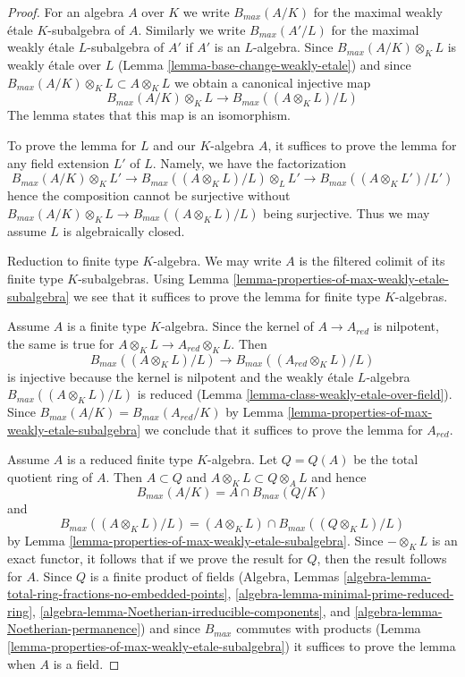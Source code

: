 \documentclass[10pt,a4paper]{amsart}
\theoremstyle{plain}
\theoremstyle{definition}
\theoremstyle{remark}
\numberwithin{equation}{subsection}
\begin{document}
\begin{proof}
For an algebra $A$ over $K$ we write $B_{max}(A/K)$
for the maximal weakly \'etale $K$-subalgebra of $A$.
Similarly we write $B_{max}(A'/L)$ for the maximal weakly \'etale
$L$-subalgebra of $A'$ if $A'$ is an $L$-algebra.
Since $B_{max}(A/K) \otimes_K L$ is weakly \'etale over $L$
(Lemma \ref{lemma-base-change-weakly-etale})
and since $B_{max}(A/K) \otimes_K L \subset A \otimes_K L$
we obtain a canonical injective map
$$
B_{max}(A/K) \otimes_K L \to B_{max}((A \otimes_K L)/L)
$$
The lemma states that this map is an isomorphism.

\medskip\noindent
To prove the lemma for $L$ and our $K$-algebra $A$, it suffices to
prove the lemma for any field extension $L'$ of $L$. Namely, we have
the factorization
$$
B_{max}(A/K) \otimes_K L' \to
B_{max}((A \otimes_K L)/L) \otimes_L L' \to
B_{max}((A \otimes_K L')/L')
$$
hence the composition cannot be surjective without
$B_{max}(A/K) \otimes_K L \to B_{max}((A \otimes_K L)/L)$
being surjective. Thus we may assume $L$ is algebraically closed.

\medskip\noindent
Reduction to finite type $K$-algebra. We may write $A$
is the filtered colimit of its finite type $K$-subalgebras.
Using Lemma \ref{lemma-properties-of-max-weakly-etale-subalgebra}
we see that it suffices to prove the lemma for finite type
$K$-algebras.

\medskip\noindent
Assume $A$ is a finite type $K$-algebra. Since the kernel
of $A \to A_{red}$ is nilpotent, the same is true for
$A \otimes_K L \to A_{red} \otimes_K L$. Then
$$
B_{max}((A \otimes_K L)/L) \to B_{max}((A_{red} \otimes_K L)/L)
$$
is injective because the kernel is nilpotent and the
weakly \'etale $L$-algebra $B_{max}((A \otimes_K L)/L)$ is reduced
(Lemma \ref{lemma-class-weakly-etale-over-field}).
Since $B_{max}(A/K) = B_{max}(A_{red}/K)$
by Lemma \ref{lemma-properties-of-max-weakly-etale-subalgebra}
we conclude
that it suffices to prove the lemma for $A_{red}$.

\medskip\noindent
Assume $A$ is a reduced finite type $K$-algebra.
Let $Q = Q(A)$ be the total quotient ring of $A$.
Then $A \subset Q$ and $A \otimes_K L \subset Q \otimes_A L$
and hence
$$
B_{max}(A/K) = A \cap B_{max}(Q/K)
$$
and
$$
B_{max}((A \otimes_K L)/L) =
(A \otimes_K L) \cap B_{max}((Q \otimes_K L)/L)
$$
by Lemma \ref{lemma-properties-of-max-weakly-etale-subalgebra}.
Since $-\otimes_K L$ is an exact functor, it follows that
if we prove the result for $Q$, then the result follows for $A$.
Since $Q$ is a finite product of fields (Algebra, Lemmas
\ref{algebra-lemma-total-ring-fractions-no-embedded-points},
\ref{algebra-lemma-minimal-prime-reduced-ring},
\ref{algebra-lemma-Noetherian-irreducible-components}, and
\ref{algebra-lemma-Noetherian-permanence})
and since $B_{max}$ commutes with products
(Lemma \ref{lemma-properties-of-max-weakly-etale-subalgebra})
it suffices to prove the lemma when $A$ is a field.


\end{proof}
\end{document}
